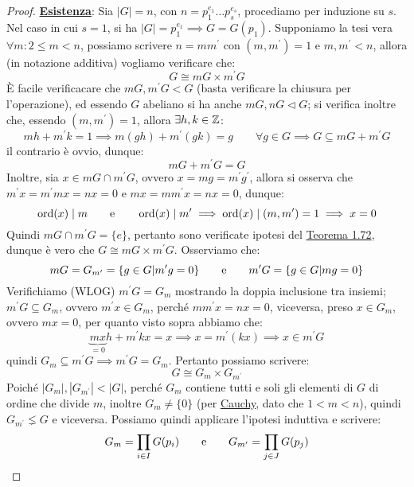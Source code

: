 \documentclass[11pt]{scrartcl}
\begin{document}
\begin{proof}
    \underline{\textbf{Esistenza}}: Sia $|G| = n$, con $n = p_1^{e_1} \ldots p_s^{e_s}$, procediamo per induzione su $s$. Nel caso in cui $s = 1$, si ha $|G| = p_1^{e_1} \implies G = G(p_1)$. Supponiamo 
    la tesi vera $\forall m : 2 \leq m < n$, possiamo scrivere $n = m m^{\prime}$ con $(m,m^{\prime}) = 1$ e $m,m^{\prime} < n$, allora (in notazione additiva) vogliamo verificare che:
        \[ G \cong mG \times m^{\prime}G
            \]
        È facile verificacare che $mG,m^{\prime}G < G$ (basta verificare la chiusura per l'operazione), ed essendo $G$ abeliano si ha anche $mG,nG \triangleleft G$; si verifica inoltre che, essendo $(m,m^{\prime}) = 1$, allora $\exists h,k \in \mathbb Z$:
            \[ mh + m^{\prime}k = 1 \implies m(gh) + m^{\prime}(gk) = g \qquad \forall g \in G \implies G \subseteq mG + m^{\prime}G
                \]
        il contrario è ovvio, dunque:
            \[ mG + m^{\prime}G = G
                \]
        Inoltre, sia $x \in mG \cap m^{\prime}G$, ovvero $x = mg = m^{\prime}g^{\prime}$, allora si osserva che $m^{\prime}x = m^{\prime}mx = nx = 0$ e $mx = mm^{\prime}x = nx = 0$, dunque:
            \[ \operatorname{ord}(x) \mid m \qquad \text e \qquad \operatorname{ord}(x) \mid m^{\prime} \implies \operatorname{ord}(x) \mid (m,m^{\prime}) = 1 \implies x = 0
                \]
        Quindi $mG \cap m^{\prime}G = \{e\}$, pertanto sono verificate ipotesi del \hyperref[t:1.72]{Teorema 1.72}, dunque è vero che $G \cong mG \times m^{\prime}G$. Osserviamo che:
            \[ mG = G_{m^{\prime}} = \{g \in G | m^{\prime}g = 0\} \qquad \text e \qquad m^{\prime}G = \{g \in G | mg = 0\}
                \]
        Verifichiamo (WLOG) $m^{\prime}G = G_m$ mostrando la doppia inclusione tra insiemi; $m^{\prime}G \subseteq G_m$, ovvero $m^{\prime}x \in G_m$, perché $mm^{\prime}x = nx = 0$, viceversa, preso 
        $x \in G_m$, ovvero $mx = 0$, per quanto visto sopra abbiamo che:
            \[ \underbrace{mx}_{= 0}h + m^{\prime}kx = x \implies x = m^{\prime}(kx) \implies x \in m^{\prime}G
                \]
        quindi $G_m \subseteq m^{\prime}G \implies m^{\prime}G = G_m$. Pertanto possiamo scrivere:
            \[ G \cong G_m \times G_{m^\prime}
                \]
        Poiché $|G_m|,|G_{m^\prime}| < |G|$, perché $G_m$ contiene tutti e soli gli elementi di $G$ di ordine che divide $m$, inoltre $G_m \ne \{0\}$ (per \hyperref[p:Cauchy]{Cauchy}, dato che $1 < m < n$),
        quindi $G_{m^{\prime}} \lneq G$ e viceversa. Possiamo quindi applicare l'ipotesi induttiva e scrivere:
            \[ G_m = \prod_{i \in I}G(p_i) \qquad \text e \qquad G_{m^{\prime}} = \prod_{j \in J}G(p_j)
\]
\end{proof}
\end{document}
